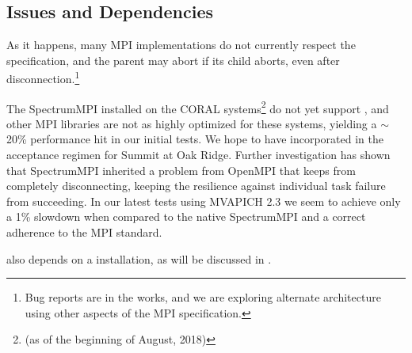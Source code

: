\subsection{Issues and Dependencies}

As it happens, many MPI implementations do not currently respect the specification, and the \spawn parent may abort if its child aborts, even after disconnection.\footnote{Bug reports are in the works, and we are exploring alternate architecture using other aspects of the MPI specification.}

The SpectrumMPI installed on the CORAL systems\footnote{(as of the beginning of August, 2018)} do not yet support \spawn, and other MPI libraries are not as highly optimized for these systems, yielding a $\sim$20\% performance hit in our initial tests.
We hope to have \spawn incorporated in the acceptance regimen for Summit at Oak Ridge.
Further investigation has shown that SpectrumMPI inherited a problem from OpenMPI that keeps \spawn from completely disconnecting, keeping the resilience against individual task failure from succeeding.
In our latest tests using MVAPICH 2.3 we seem to achieve only a 1\% slowdown when compared to the native SpectrumMPI and a correct adherence to the MPI standard.

\mpijm also depends on a \python installation, as will be discussed in .

